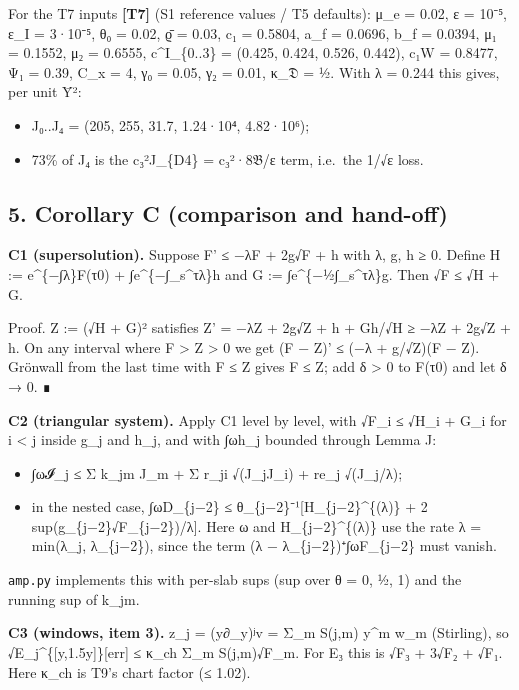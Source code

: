 \documentclass[
]{article}
\providecommand{\tightlist}{%
  \setlength{\itemsep}{0pt}\setlength{\parskip}{0pt}}
\begin{document}
For the T7 inputs \textbf{{[}T7{]}} (S1 reference values / T5 defaults):
μ\_e = 0.02, ε = 10⁻⁵, ε\_I = 3·10⁻⁵, θ₀ = 0.02, ϱ̄ = 0.03, c₁ = 0.5804,
a\_f = 0.0696, b\_f = 0.0394, μ₁ = 0.1552, μ₂ = 0.6555, c\^{}I\_\{0..3\}
= (0.425, 0.424, 0.526, 0.442), c₁W = 0.8477, Ψ₁ = 0.39, C\_x = 4, γ₀ =
0.05, γ₂ = 0.01, κ\_𝔇 = ½. With λ = 0.244 this gives, per unit Ȳ²:

\begin{itemize}
\tightlist
\item
  J₀..J₄ = (205, 255, 31.7, 1.24·10⁴, 4.82·10⁶);
\item
  73\% of J₄ is the c₃²J\_\{D4\} = c₃²·8𝔅/ε term, i.e.~the 1/√ε loss.
\end{itemize}

\hypertarget{corollary-c-comparison-and-hand-off}{%
\subsection{5. Corollary C (comparison and
hand-off)}\label{corollary-c-comparison-and-hand-off}}

\textbf{C1 (supersolution).} Suppose F' ≤ −λF + 2g√F + h with λ, g, h ≥
0. Define H := e\^{}\{−∫λ\}F(τ0) + ∫e\^{}\{−∫\_s\^{}τλ\}h and G :=
∫e\^{}\{−½∫\_s\^{}τλ\}g. Then √F ≤ √H + G.

Proof. Z := (√H + G)² satisfies Z' = −λZ + 2g√Z + h + Gh/√H ≥ −λZ + 2g√Z
+ h. On any interval where F \textgreater{} Z \textgreater{} 0 we get (F
− Z)' ≤ (−λ + g/√Z)(F − Z). Grönwall from the last time with F ≤ Z gives
F ≤ Z; add δ \textgreater{} 0 to F(τ0) and let δ → 0. ∎

\textbf{C2 (triangular system).} Apply C1 level by level, with √F\_i ≤
√H\_i + G\_i for i \textless{} j inside g\_j and h\_j, and with ∫ωh\_j
bounded through Lemma J:

\begin{itemize}
\tightlist
\item
  ∫ω𝓘\_j ≤ Σ k\_jm J\_m + Σ r\_ji √(J\_jJ\_i) + re\_j √(J\_j/λ);
\item
  in the nested case, ∫ωD\_\{j−2\} ≤
  θ\_\{j−2\}⁻¹{[}H\_\{j−2\}\^{}\{(λ)\} + 2
  sup(g\_\{j−2\}√F\_\{j−2\})/λ{]}. Here ω and H\_\{j−2\}\^{}\{(λ)\} use
  the rate λ = min(λ\_j, λ\_\{j−2\}), since the term (λ −
  λ\_\{j−2\})⁺∫ωF\_\{j−2\} must vanish.
\end{itemize}

\texttt{amp.py} implements this with per-slab sups (sup over θ = 0, ½,
1) and the running sup of k\_jm.

\textbf{C3 (windows, item 3).} z\_j = (y∂\_y)ʲv = Σ\_m S(j,m) y\^{}m
w\_m (Stirling), so √E\_j\^{}\{{[}y,1.5y{]}\}{[}err{]} ≤ κ\_ch Σ\_m
S(j,m)√F\_m. For E₃ this is √F₃ + 3√F₂ + √F₁. Here κ\_ch is T9's chart
factor (≤ 1.02).
\end{document}
